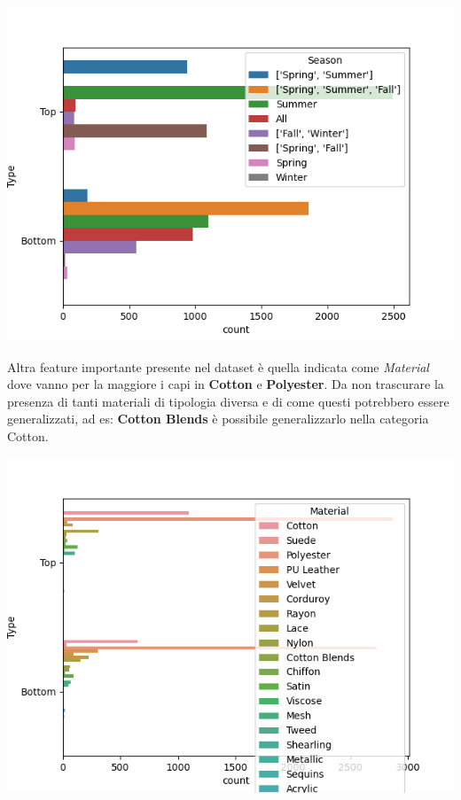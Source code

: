 \documentclass[a4paper, 11pt, oneside]{report}
\begin{document}
                \begin{center}
                    \includegraphics[scale=0.4]{countSeasonTopBottom}
                \end{center}
                \newpage
                \par \noindent Altra feature importante presente nel dataset è quella indicata come \textit{Material}
                dove vanno per la maggiore i capi in \textbf{Cotton} e \textbf{Polyester}. Da non trascurare la presenza
                di tanti materiali di tipologia diversa e di come questi potrebbero essere generalizzati, ad es: \textbf{Cotton Blends}
                è possibile generalizzarlo nella categoria Cotton.
                \begin{center}
                    \includegraphics[scale=0.4]{countMaterialTopBottom}
                \end{center}
\end{document}

